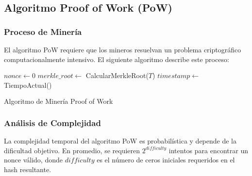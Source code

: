 \documentclass[spanish,12pt,letterpaper]{report}
\begin{document}
\subsection{Algoritmo Proof of Work (PoW)}

\subsubsection{Proceso de Minería}

El algoritmo PoW requiere que los mineros resuelvan un problema criptográfico computacionalmente intensivo. El siguiente algoritmo describe este proceso:

\begin{algorithm}[H]
\small
\SetAlgoLined
{}


\BlankLine
$nonce \leftarrow 0$\;
$merkle\_root \leftarrow$ CalcularMerkleRoot($T$)\;
$timestamp \leftarrow$ TiempoActual()\;

\caption{Algoritmo de Minería Proof of Work}
\end{algorithm}

\subsubsection{Análisis de Complejidad}

La complejidad temporal del algoritmo PoW es probabilística y depende de la dificultad objetivo. En promedio, se requieren $2^{difficulty}$ intentos para encontrar un nonce válido, donde $difficulty$ es el número de ceros iniciales requeridos en el hash resultante.
\end{document}
